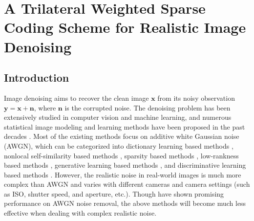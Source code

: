 %
\chapter{A Trilateral Weighted Sparse Coding Scheme for Realistic Image Denoising}
\label{sec:internalsc}


\section{Introduction}

Image denoising aims to recover the clean image $\bm{x}$ from its noisy observation $\bm{y}=\bm{x}+\bm{n}$, where $\bm{n}$ is the corrupted noise. The denoising problem has been extensively studied in computer vision and machine learning, and numerous statistical image modeling and learning methods have been proposed in the past decades \cite{ksvd,bm3d,cbm3d,lssc,ncsr,wnnm,epll,pgpd,mlp,csf,tnrd,dncnn,
Liu2008,noiseclinic,Zhu_2016_CVPR,crosschannel2016,neatimage}. Most of the existing methods \cite{ksvd,bm3d,cbm3d,lssc,ncsr,wnnm,epll,pgpd,mlp,csf,tnrd,dncnn} focus on additive white Gaussian noise (AWGN), which can be categorized into dictionary learning based methods \cite{ksvd}, nonlocal self-similarity based methods \cite{bm3d,cbm3d,lssc,ncsr,wnnm}, sparsity based methods \cite{ksvd,bm3d,cbm3d,lssc,ncsr}, low-rankness based methods \cite{wnnm}, generative learning based methods \cite{epll,pgpd}, and discriminative learning based methods \cite{mlp,csf,tnrd,dncnn}. However, the realistic noise in real-world images is much more complex than AWGN \cite{crosschannel2016} and varies with different cameras and camera settings (such as ISO, shutter speed, and aperture, etc.). Though have shown promising performance on AWGN noise removal, the above methods \cite{ksvd,bm3d,cbm3d,lssc,ncsr,wnnm,epll,pgpd,mlp,csf,tnrd,dncnn} will become much less effective when dealing with complex realistic noise.

